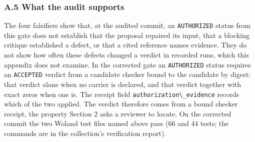 \documentclass[
  11pt,
]{article}
\newcommand{\passthrough}[1]{#1}
\begin{document}
\subsubsection{A.5 What the audit
supports}\label{a.5-what-the-audit-supports}

The four falsifiers show that, at the audited commit, an
\passthrough{\lstinline!AUTHORIZED!} status from this gate does not
establish that the proposal repaired its input, that a blocking critique
established a defect, or that a cited reference names evidence. They do
not show how often these defects changed a verdict in recorded runs,
which this appendix does not examine. In the corrected gate an
\passthrough{\lstinline!AUTHORIZED!} status requires an
\passthrough{\lstinline!ACCEPTED!} verdict from a candidate checker
bound to the candidate by digest: that verdict alone when no carrier is
declared, and that verdict together with exact zeros when one is. The
receipt field \passthrough{\lstinline!authorization\_evidence!} records
which of the two applied. The verdict therefore comes from a bound
checker receipt, the property Section 2 asks a reviewer to locate. On
the corrected commit the two Woland test files named above pass (66 and
44 tests; the commands are in the collection's verification report).
\end{document}
